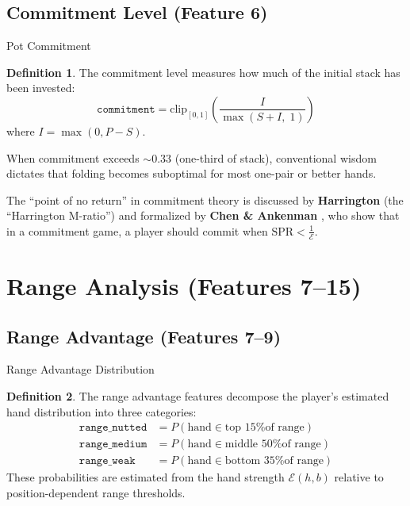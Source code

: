 \documentclass[11pt, a4paper]{article}
\theoremstyle{definition}
\newtheorem{definition}{Definition}[section]
\newcommand{\feature}[1]{\texttt{#1}}
\newcommand{\clip}[1]{\text{clip}_{[0,1]}\!\left(#1\right)}
\begin{document}
\subsection{Commitment Level (Feature 6)}

\begin{featurebox}{Pot Commitment}
\begin{definition}
The commitment level measures how much of the initial stack has been invested:
\begin{equation}
    \feature{commitment} = \clip{\frac{I}{\max(S + I,\; 1)}}
\end{equation}
where $I = \max(0, P - S)$.

When commitment exceeds $\sim 0.33$ (one-third of stack), conventional wisdom dictates that folding becomes suboptimal for most one-pair or better hands.
\end{definition}
\end{featurebox}

\begin{refbox}
The ``point of no return'' in commitment theory is discussed by \textbf{Harrington} \cite{harrington2004} (the ``Harrington M-ratio'') and formalized by \textbf{Chen \& Ankenman} \cite{chen2006}, who show that in a commitment game, a player should commit when $\text{SPR} < \frac{1}{\mathcal{E}}$.
\end{refbox}

\section{Range Analysis (Features 7--15)}

\subsection{Range Advantage (Features 7--9)}

\begin{featurebox}{Range Advantage Distribution}
\begin{definition}
The range advantage features decompose the player's estimated hand distribution into three categories:
\begin{align}
    \feature{range\_nutted} &= P(\text{hand} \in \text{top 15\% of range}) \\
    \feature{range\_medium} &= P(\text{hand} \in \text{middle 50\% of range}) \\
    \feature{range\_weak} &= P(\text{hand} \in \text{bottom 35\% of range})
\end{align}
These probabilities are estimated from the hand strength $\mathcal{E}(h, b)$ relative to position-dependent range thresholds.
\end{definition}
\end{featurebox}
\end{document}
